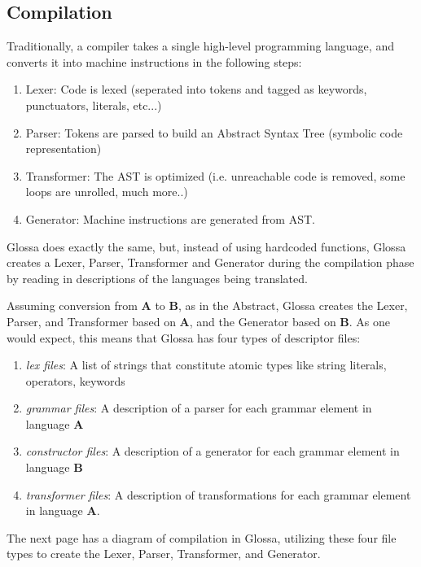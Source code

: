 \documentclass{article}
\begin{document}
\subsection{Compilation}
Traditionally, a compiler takes a single high-level programming language, and converts it into machine instructions in the following steps:
\begin{enumerate}
\item Lexer: Code is lexed (seperated into tokens and tagged as keywords, punctuators, literals, etc...)
\item Parser: Tokens are parsed to build an Abstract Syntax Tree (symbolic code representation)
\item Transformer: The AST is optimized (i.e. unreachable code is removed, some loops are unrolled, much more..)
\item Generator: Machine instructions are generated from AST.
\end{enumerate}

Glossa does exactly the same, but, instead of using hardcoded functions, Glossa creates a Lexer, Parser, Transformer and Generator during the compilation phase by reading in descriptions of the languages being translated.

Assuming conversion from \textbf{A} to \textbf{B}, as in the Abstract, Glossa creates the Lexer, Parser, and Transformer based on \textbf{A}, and the Generator based on \textbf{B}.
As one would expect, this means that Glossa has four types of descriptor files:

\begin{enumerate}
    \item \textit{lex files}: A list of strings that constitute atomic types like string literals, operators, keywords 
    \item \textit{grammar files}: A description of a parser for each grammar element in language \textbf{A} 
    \item \textit{constructor files}: A description of a generator for each grammar element in language \textbf{B}
    \item \textit{transformer files}: A description of transformations for each grammar element in language \textbf{A}.
\end{enumerate}

The next page has a diagram of compilation in Glossa, utilizing these four file types to create the Lexer, Parser, Transformer, and Generator.

\newpage
\end{document}
